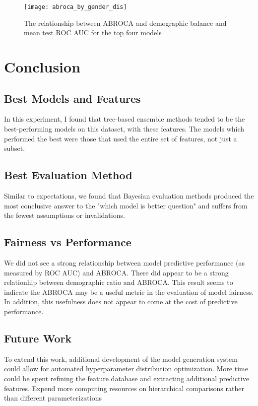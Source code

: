 \documentclass{article}
\begin{document}
        \begin{figure}
            \centering
            \texttt{[image: abroca\_by\_gender\_dis]}
            \caption{The relationship between ABROCA and demographic balance and mean test ROC AUC for the top four models}
            \label{fig:abroca_by_gender_dis}
        \end{figure}

\section{Conclusion}

    \subsection{Best Models and Features}
        In this experiment, I found that tree-based ensemble methods tended to be the best-performing models on this dataset, with these features.
        The models which performed the best were those that used the entire set of features, not just a subset.
        
    \subsection{Best Evaluation Method}
        Similar to expectations, we found that Bayesian evaluation methods produced the most conclusive answer to the "which model is better question" and suffers from the fewest assumptions or invalidations.

        
    \subsection{Fairness vs Performance}
        We did not see a strong relationship between model predictive performance (as measured by ROC AUC) and ABROCA.
        There did appear to be a strong relationhip between demographic ratio and ABROCA.
        This result seems to indicate the ABROCA may be a useful metric in the evaluation of model fairness.
        In addition, this usefulness does not appear to come at the cost of predictive performance.

    \subsection{Future Work}
        To extend this work, additional development of the model generation system could allow for automated hyperparameter distribution optimization.
        More time could be spent refining the feature database and extracting additional predictive features.
        Expend more computing resources on hierarchical comparisons rather than different parameterizations 
        
\end{document}
